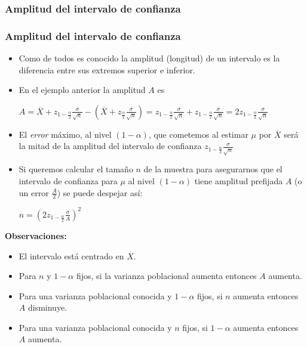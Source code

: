     \subsubsection{Amplitud del intervalo de confianza}
    
\begin{frame}

    \frametitle{Amplitud del intervalo de confianza}
    \begin{itemize}
\item Como de todos es conocido la amplitud (longitud) de un intervalo
    es la diferencia entre sus extremos superior e inferior.
\item  En el ejemplo anterior la amplitud $A$ es

    $A=\overline{X}+z_{1-\frac{\alpha}{2}}\frac{\sigma}{\sqrt{n}}-
 \left(\overline{X}+z_{\frac{\alpha}{2}}
 \frac{\sigma}{\sqrt{n}}\right)=
z_{1-\frac{\alpha}{2}}\frac{\sigma}{\sqrt{n}}+z_{1-\frac{\alpha}{2}}\frac{\sigma}{\sqrt{n}}=2
z_{1-\frac{\alpha}{2}}\frac{\sigma}{\sqrt{n}}$
\item 
El \emph{error} máximo, al nivel $(1-\alpha)$, que cometemos al estimar $\mu$ por
$\overline{X}$ será la mitad de la amplitud del  intervalo de confianza $
z_{1-\frac{\alpha}{2}}\frac{\sigma}{\sqrt{n}}$
\item 
Si queremos calcular el tamaño $n$ de la muestra para asegurarnos que el intervalo de
confianza para $\mu$ al nivel $(1-\alpha)$ tiene amplitud prefijada $A$ (o un error
$\frac{A}{2}$)  se puede despejar así:

$n=\left(  2 z_{1-\frac{\alpha}{2}}\frac{\sigma}{A} \right)^2$
\end{itemize}
\end{frame}

\begin{frame}
    \textbf{Observaciones:}

    \begin{itemize}
    \item El intervalo está centrado en $\overline{X}$.
    \item  Para $n$ y $1-\alpha$ fijos, si la varianza poblacional aumenta entonces $A$
    aumenta.
    \item Para una varianza poblacional conocida y $1-\alpha$ fijos,  si $n$ aumenta entonces
      $A$ disminuye.
      \item Para una varianza poblacional conocida y $n$ fijos,  si
      $1-\alpha$ aumenta entonces $A$ aumenta.
    \end{itemize}
\end{frame}
